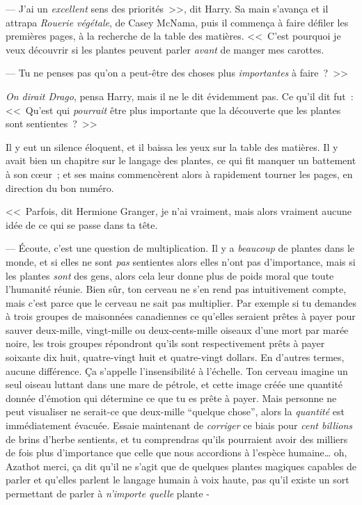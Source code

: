 --- J'ai un \emph{excellent} sens des priorités~>>, dit Harry. Sa main s'avança et il attrapa \emph{Rouerie végétale}, de Casey McNama, puis il commença à faire défiler les premières pages, à la recherche de la table des matières. <<~C'est pourquoi je veux découvrir si les plantes peuvent parler \emph{avant} de manger mes carottes.

--- Tu ne penses pas qu'on a peut-être des choses plus \emph{importantes} à faire~?~>>

\emph{On dirait Drago}, pensa Harry, mais il ne le dit évidemment pas. Ce qu'il dit fut~: <<~Qu'est qui \emph{pourrait} être plus importante que la découverte que les plantes sont sentientes~?~>>

Il y eut un silence éloquent, et il baissa les yeux sur la table des matières. Il y avait bien un chapitre sur le langage des plantes, ce qui fit manquer un battement à son cœur~; et ses mains commencèrent alors à rapidement tourner les pages, en direction du bon numéro.

<<~Parfois, dit Hermione Granger, je n'ai vraiment, mais alors vraiment aucune idée de ce qui se passe dans ta tête.

--- Écoute, c'est une question de multiplication. Il y a \emph{beaucoup} de plantes dans le monde, et si elles ne sont \emph{pas} sentientes alors elles n'ont pas d'importance, mais si les plantes \emph{sont} des gens, alors cela leur donne plus de poids moral que toute l'humanité réunie. Bien sûr, ton cerveau ne s'en rend pas intuitivement compte, mais c'est parce que le cerveau ne sait pas multiplier. Par exemple si tu demandes à trois groupes de maisonnées canadiennes ce qu'elles seraient prêtes à payer pour sauver deux-mille, vingt-mille ou deux-cents-mille oiseaux d'une mort par marée noire, les trois groupes répondront qu'ils sont respectivement prêts à payer soixante dix huit, quatre-vingt huit et quatre-vingt dollars. En d'autres termes, aucune différence. Ça s'appelle l'insensibilité à l'échelle. Ton cerveau imagine un seul oiseau luttant dans une mare de pétrole, et cette image créée une quantité donnée d'émotion qui détermine ce que tu es prête à payer. Mais personne ne peut visualiser ne serait-ce que deux-mille “quelque chose”, alors la \emph{quantité} est immédiatement évacuée. Essaie maintenant de \emph{corriger} ce biais pour \emph{cent billions} de brins d'herbe sentients, et tu comprendras qu'ils pourraient avoir des milliers de fois plus d'importance que celle que nous accordions à l'espèce humaine… oh, Azathot merci, ça dit qu'il ne s'agit que de quelques plantes magiques capables de parler et qu'elles parlent le langage humain à voix haute, pas qu'il existe un sort permettant de parler à \emph{n'importe quelle} plante -

